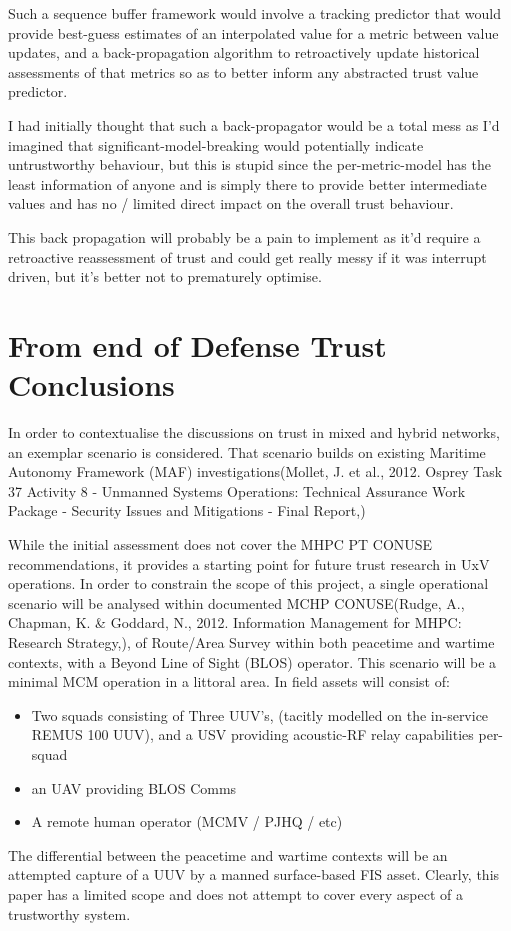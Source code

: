 Such a sequence buffer framework would involve a tracking predictor that would provide best-guess estimates of an interpolated value for a metric between value updates, and a back-propagation algorithm to retroactively update historical assessments of that metrics so as to better inform any abstracted trust value predictor.

I had initially thought that such a back-propagator would be a total mess as I'd imagined that significant-model-breaking would potentially indicate untrustworthy behaviour, but this is stupid since the per-metric-model has the least information of anyone and is simply there to provide better intermediate values and has no / limited direct impact on the overall trust behaviour. 

This back propagation will probably be a pain to implement as it'd require a retroactive reassessment of trust and could get really messy if it was interrupt driven, but it's better not to prematurely optimise.


\section{From end of Defense Trust Conclusions}
In order to contextualise the discussions on trust in mixed and hybrid networks, an exemplar scenario is considered.
That scenario builds on existing Maritime Autonomy Framework (MAF) investigations(Mollet, J. et al., 2012. Osprey Task 37 Activity 8 - Unmanned Systems Operations: Technical Assurance Work Package - Security Issues and Mitigations - Final Report,)

While the initial assessment does not cover the MHPC PT CONUSE recommendations, it provides a starting point for future trust research in UxV operations.
In order to constrain the scope of this project, a single operational scenario will be analysed within documented MCHP CONUSE(Rudge, A., Chapman, K. \& Goddard, N., 2012. Information Management for MHPC: Research Strategy,), of Route/Area Survey within both peacetime and wartime contexts, with a Beyond Line of Sight (BLOS) operator.
This scenario will be a minimal MCM operation in a littoral area.
In field assets will consist of:
\begin{itemize}
  \item Two squads consisting of Three UUV’s, (tacitly modelled on the in-service REMUS 100 UUV), and a USV providing acoustic-RF relay capabilities per-squad
  \item	an UAV providing BLOS Comms
  \item	A remote human operator (MCMV / PJHQ / etc)
\end{itemize}


The differential between the peacetime and wartime contexts will be an attempted capture of a UUV by a manned surface-based FIS asset.
Clearly, this paper has a limited scope and does not attempt to cover every aspect of a trustworthy system.


